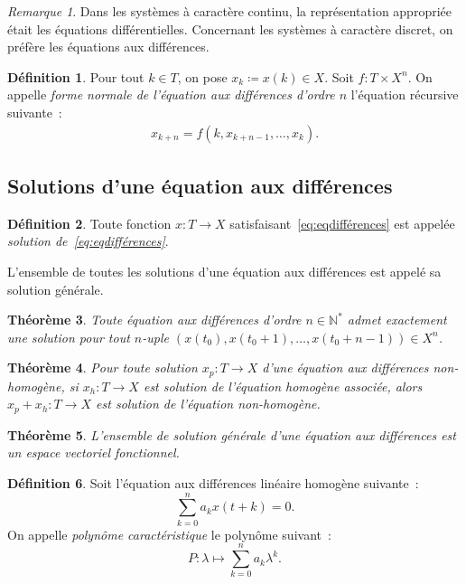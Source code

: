 \documentclass{article}
\newtheorem{thm}{Théorème}[section]
\theoremstyle{definition}
\newtheorem{déf}[thm]{Définition}
\theoremstyle{remark}
\newtheorem*{rmq}{Remarque}
\newcommand{\N}{\mathbb N}
\begin{document}
	\begin{rmq} Dans les systèmes à caractère continu, la représentation appropriée était les équations différentielles. Concernant les systèmes à caractère
	discret, on préfère les équations aux différences.
	\end{rmq}

	\begin{déf} Pour tout $k \in T$, on pose $x_k \coloneqq x(k) \in X$. Soit $f : T \times X^n$. On appelle \textit{forme normale de l'équation aux différences
	d'ordre $n$} l'équation récursive suivante~:
	\begin{align}\label{eq:eqdifférences}\tag{\#}
		x_{k+n} = f(k, x_{k+n-1}, \ldots, x_k).
	\end{align}
	\end{déf}

	\subsection{Solutions d'une équation aux différences}

	\begin{déf} Toute fonction $x : T \to X$ satisfaisant~\eqref{eq:eqdifférences} est appelée \textit{solution de~\eqref{eq:eqdifférences}}.

	L'ensemble de toutes les solutions d'une équation aux différences est appelé sa solution générale.
	\end{déf}

	\begin{thm} Toute équation aux différences d'ordre $n \in \N^*$ admet exactement une solution pour tout $n$-uple $(x(t_0), x(t_0+1), \ldots, x(t_0+n-1)) \in X^n$.
	\end{thm}

	\begin{thm} Pour toute solution $x_p : T \to X$ d'une équation aux différences non-homogène, si $x_h : T \to X$ est solution de l'équation homogène associée,
	alors $x_p+x_h : T \to X$ est solution de l'équation non-homogène.
	\end{thm}

	\begin{thm} L'ensemble de solution générale d'une équation aux différences est un espace vectoriel fonctionnel.
	\end{thm}

	\begin{déf} Soit l'équation aux différences linéaire homogène suivante~:
	\[\sum_{k=0}^na_kx(t+k) = 0.\]
	On appelle \textit{polynôme caractéristique} le polynôme suivant~:
	\[P : \lambda \mapsto \sum_{k=0}^na_k\lambda^k.\]
	\end{déf}
\end{document}
